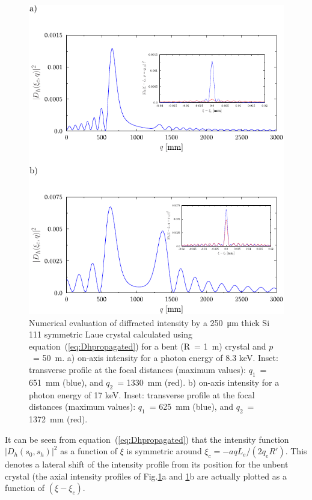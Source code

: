 \documentclass[preprint]{iucr}              %
\begin{document}
\begin{figure}
\label{fig:8keV}
\caption{Numerical evaluation of diffracted intensity by a \SI{250}{\micro\meter} thick Si 111 symmetric Laue crystal calculated using equation~(\ref{eq:Dhpropagated}) for a bent (R~= \SI{1}{\meter}) crystal and $p$~= \SI{50}{\meter}. 
a) on-axis intensity for a photon energy of 8.3 keV. 
Inset: transverse profile at the focal distances (maximum values):  
$q_1$~= \SI{651}{\milli\meter} (blue), and
$q_2$~= \SI{1330}{\milli\meter} (red).
b) on-axis intensity for a photon energy of 17 keV.
Inset: transverse profile at the focal distances (maximum values):
$q_1$~= \SI{625}{\milli\meter} (blue), and 
$q_2$~= \SI{1372}{\milli\meter} (red).
}
\includegraphics[width=1\textwidth]{fig5.pdf}
\end{figure}

It can be seen from equation~(\ref{eq:Dhpropagated}) that the intensity function $|D_h(s_0,s_h)|^2$ as a function of $\xi$ is symmetric around $\xi_c=-a q L_e / (2 q_e R')$. This denotes a lateral shift of the intensity profile from its position for the unbent crystal (the axial intensity profiles of Fig.\ref{fig:8keV}a and \ref{fig:8keV}b are actually plotted as a function of $(\xi-\xi_c)$.
\end{document}
